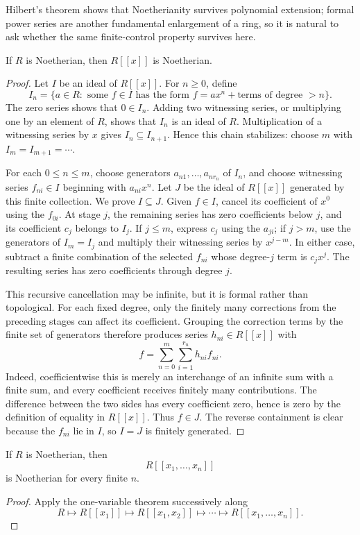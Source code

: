Hilbert's theorem shows that Noetherianity survives polynomial extension;
formal power series are another fundamental enlargement of a ring, so it is
natural to ask whether the same finite-control property survives here.
\begin{theorem}
If \(R\) is Noetherian, then \(R[[x]]\) is Noetherian.
\end{theorem}
\begin{proof}
Let \(I\) be an ideal of \(R[[x]]\).  For \(n\ge0\), define
\[
I_n=\{a\in R:\text{ some }f\in I\text{ has the form }
f=ax^n+\text{terms of degree }>n\}.
\]
The zero series shows that \(0\in I_n\).  Adding two witnessing series, or
multiplying one by an element of \(R\), shows that \(I_n\) is an ideal of
\(R\).  Multiplication of a witnessing series by \(x\) gives
\(I_n\subseteq I_{n+1}\).  Hence this chain stabilizes: choose \(m\) with
\(I_m=I_{m+1}=\cdots\).

For each \(0\le n\le m\), choose generators
\(a_{n1},\ldots,a_{nr_n}\) of \(I_n\), and choose witnessing series
\(f_{ni}\in I\) beginning with \(a_{ni}x^n\).  Let \(J\) be the ideal of
\(R[[x]]\) generated by this finite collection.  We prove \(I\subseteq J\).
Given \(f\in I\), cancel its coefficient of \(x^0\) using the \(f_{0i}\).
At stage \(j\), the remaining series has zero coefficients below \(j\), and
its coefficient \(c_j\) belongs to \(I_j\).  If \(j\le m\), express \(c_j\)
using the \(a_{ji}\); if \(j>m\), use the generators of \(I_m=I_j\) and
multiply their witnessing series by \(x^{j-m}\).  In either case, subtract a
finite combination of the selected \(f_{ni}\) whose degree-\(j\) term is
\(c_jx^j\).  The resulting series has zero coefficients through degree
\(j\).

This recursive cancellation may be infinite, but it is formal rather than
topological.  For each fixed degree, only the finitely many corrections from
the preceding stages can affect its coefficient.  Grouping the correction
terms by the finite set of generators therefore produces series
\(h_{ni}\in R[[x]]\) with
\[
f=\sum_{n=0}^m\sum_{i=1}^{r_n}h_{ni}f_{ni}.
\]
Indeed, coefficientwise this is merely an interchange of an infinite sum with
a finite sum, and every coefficient receives finitely many contributions.
The difference between the two sides has every coefficient zero, hence is
zero by the definition of equality in \(R[[x]]\).  Thus \(f\in J\).  The
reverse containment is clear because the \(f_{ni}\) lie in \(I\), so
\(I=J\) is finitely generated.
\end{proof}
\begin{corollary}
If \(R\) is Noetherian, then
\[
R[[x_1,\ldots,x_n]]
\]
is Noetherian for every finite \(n\).
\end{corollary}
\begin{proof}
Apply the one-variable theorem successively along
\[
R\longmapsto R[[x_1]]\longmapsto R[[x_1,x_2]]\longmapsto\cdots
\longmapsto R[[x_1,\ldots,x_n]].
\]
\end{proof}

